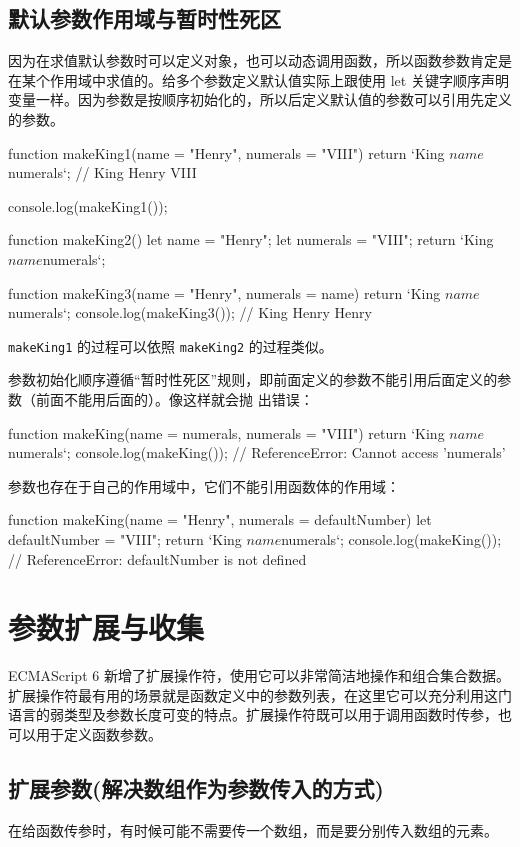 \subsection{默认参数作用域与暂时性死区}
因为在求值默认参数时可以定义对象，也可以动态调用函数，所以函数参数肯定是在某个作用域中求值的。给多个参数定义默认值实际上跟使用 let 关键字顺序声明变量一样。因为参数是按顺序初始化的，所以后定义默认值的参数可以引用先定义的参数。
\begin{js}
function makeKing1(name = "Henry", numerals = "VIII") {
  return `King ${name} ${numerals}`; // King Henry VIII
}

console.log(makeKing1());

function makeKing2() {
  let name = "Henry";
  let numerals = "VIII";
  return `King ${name} ${numerals}`;
}

function makeKing3(name = "Henry", numerals = name) {
  return `King ${name} ${numerals}`;
}
console.log(makeKing3()); // King Henry Henry
\end{js}

\verb|makeKing1| 的过程可以依照 \verb|makeKing2| 的过程类似。

参数初始化顺序遵循“暂时性死区”规则，即前面定义的参数不能引用后面定义的参数（前面不能用后面的）。像这样就会抛
出错误：
\begin{js}
function makeKing(name = numerals, numerals = "VIII") {
  return `King ${name} ${numerals}`;
}
console.log(makeKing()); // ReferenceError: Cannot access 'numerals'
\end{js}

参数也存在于自己的作用域中，它们不能引用函数体的作用域：
\begin{js}
function makeKing(name = "Henry", numerals = defaultNumber) {
  let defaultNumber = "VIII";
  return `King ${name} ${numerals}`;
}
console.log(makeKing()); // ReferenceError: defaultNumber is not defined
\end{js}

\section{参数扩展与收集}
ECMAScript 6 新增了扩展操作符，使用它可以非常简洁地操作和组合集合数据。扩展操作符最有用的场景就是函数定义中的参数列表，在这里它可以充分利用这门语言的弱类型及参数长度可变的特点。扩展操作符既可以用于调用函数时传参，也可以用于定义函数参数。
\subsection{扩展参数(解决数组作为参数传入的方式)}
在给函数传参时，有时候可能不需要传一个数组，而是要分别传入数组的元素。

